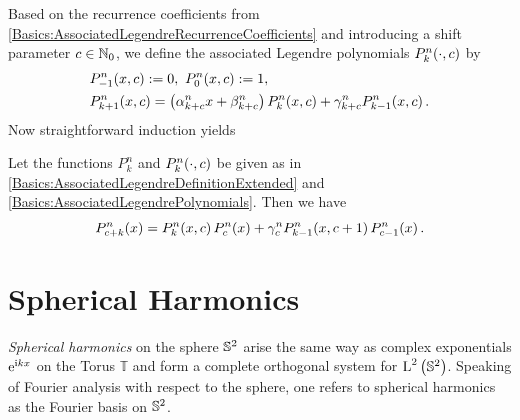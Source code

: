 Based on the recurrence coefficients from \eqref{Basics:AssociatedLegendreRecurrenceCoefficients} 
and introducing a shift parameter $c \in \mathbb{N}_{0}$, we 
define the associated Legendre polynomials $P_{k}^n{\hspace{-0.4ex}}\left(\cdot,c\right)$ by
\begin{equation}
  \label{Basics:AssociatedLegendrePolynomials}
  \begin{split}
    & P_{-1}^n{\hspace{-0.4ex}}\left(x,c\right) := 0,\ P_{0}^n{\hspace{-0.4ex}}\left(x,c\right) := 1,\\
    & P_{k+1}^n{\hspace{-0.4ex}}\left(x,c\right) = \left(\alpha_{k+c}^n x + \beta_{k+c}^n\right) P_{k}^n{\hspace{-0.4ex}}\left(x,c\right) + \gamma_{k+c}^n P_{k-1}^n{\hspace{-0.4ex}}\left(x,c\right).
  \end{split}
\end{equation}
Now straightforward induction yields
\begin{lemma}
  \label{Basics:AssociatedLegendreRecurrence}
  Let the functions $P_{k}^n$ and $P_{k}^n{\hspace{-0.4ex}}\left(\cdot,c\right)$ be given as in \eqref{Basics:AssociatedLegendreDefinitionExtended} and 
  \eqref{Basics:AssociatedLegendrePolynomials}. Then we have
  $$ P_{c+k}^n{\hspace{-0.4ex}}\left(x\right) = P_{k}^n{\hspace{-0.4ex}}\left(x,c\right) P_{c}^n{\hspace{-0.4ex}}\left(x\right) + \gamma_{c}^n P_{k-1}^n{\hspace{-0.4ex}}\left(x,c+1\right) P_{c-1}^n{\hspace{-0.4ex}}\left(x\right). $$
\end{lemma}

\section{Spherical Harmonics}
\label{Basics:SphericalHarmonics}

\emph{Spherical harmonics} on the sphere $\mathbb{S}^2$ arise the same way as complex exponentials 
$\mbox{\rm{e}}^{\mbox{\scriptsize\rm{i}} k x}$ on the Torus $\mathbb{T}$ and form a complete orthogonal system for $\text{\rm{L}}^{2}\left(\mathbb{S}^2\right)$.
Speaking of Fourier analysis with respect to the sphere, one refers to spherical harmonics as the Fourier 
basis on $\mathbb{S}^2$. 

